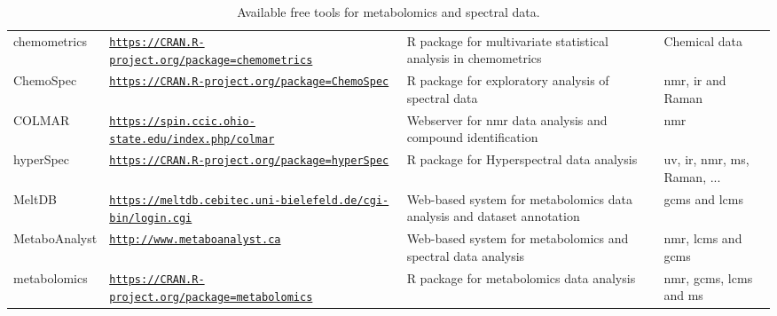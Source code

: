 \begin{table}[h]
	\caption{Available free tools for metabolomics and spectral data.} 
	\label{tools}
	\begin{scriptsize}
		\tabulinesep=1.2mm
		\begin{tabu}{|m{1.8cm}|m{5.2cm}|m{5cm}|m{2.4cm}|}		
			 &  &  &  \\
			\hline
			
			chemometrics & \href{https://CRAN.R-project.org/package=chemometrics}{\nolinkurl{https://CRAN.R-project.org/package=chemometrics}} & R package for multivariate statistical analysis in chemometrics & Chemical data \\ 				
			\hline 
			
			ChemoSpec & \href{https://CRAN.R-project.org/package=ChemoSpec}{\nolinkurl{https://CRAN.R-project.org/package=ChemoSpec}} & R package for exploratory analysis of spectral data & \gls{nmr}, \gls{ir} and Raman  \\ 		
			\hline 
			
			COLMAR & \href{https://spin.ccic.ohio-state.edu/index.php/colmar}{\nolinkurl{https://spin.ccic.ohio-state.edu/index.php/colmar}} & Webserver for \gls{nmr} data analysis and compound identification & \gls{nmr} \\ 
			
			\hline 
			hyperSpec & \href{https://CRAN.R-project.org/package=hyperSpec}{\nolinkurl{https://CRAN.R-project.org/package=hyperSpec}} & R package for Hyperspectral data analysis & \gls{uv}, \gls{ir}, \gls{nmr}, \gls{ms}, Raman, ... \\ 
			
			\hline 
			MeltDB & \href{https://meltdb.cebitec.uni-bielefeld.de/cgi-bin/login.cgi}{\nolinkurl{https://meltdb.cebitec.uni-bielefeld.de/cgi-bin/login.cgi}} & Web-based system for metabolomics data analysis and dataset annotation & \gls{gcms} and \gls{lcms} \\ 
			
			\hline 
			MetaboAnalyst & \href{http://www.metaboanalyst.ca}{\nolinkurl{http://www.metaboanalyst.ca}} & Web-based system for metabolomics and spectral data analysis & \gls{nmr}, \gls{lcms} and \gls{gcms} \\ 
			
			\hline
			metabolomics & \href{https://CRAN.R-project.org/package=metabolomics}{\nolinkurl{https://CRAN.R-project.org/package=metabolomics}} & R package for metabolomics data analysis & \gls{nmr}, \gls{gcms}, \gls{lcms} and \gls{ms} \\
			

\end{tabu}
\end{scriptsize}
\end{table}

